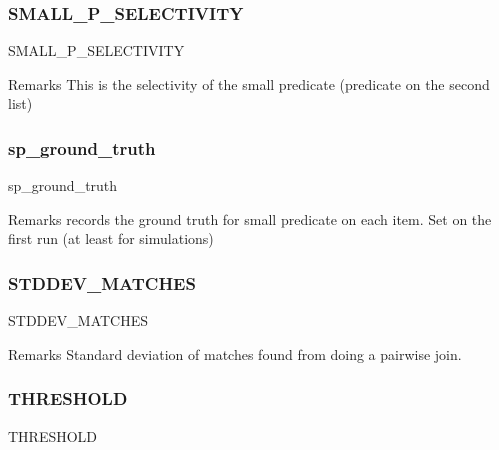 \subsubsection{\texorpdfstring{SMALL\_P\_SELECTIVITY}{SMALL\_P\_SELECTIVITY}}
{\footnotesize\ttfamily S\+M\+A\+L\+L\+\_\+\+P\+\_\+\+S\+E\+L\+E\+C\+T\+I\+V\+I\+TY}

\begin{DoxyRemark}{Remarks}
This is the selectivity of the small predicate (predicate on the second list) 
\end{DoxyRemark}
\mbox{\label{classdynamicfilterapp_1_1models_1_1_join_a26373c16feba2f10410b78ea16841a21}} 
\subsubsection{\texorpdfstring{sp\_ground\_truth}{sp\_ground\_truth}}
{\footnotesize\ttfamily sp\+\_\+ground\+\_\+truth}

\begin{DoxyRemark}{Remarks}
records the ground truth for small predicate on each item. Set on the first run (at least for simulations) 
\end{DoxyRemark}
\mbox{\label{classdynamicfilterapp_1_1models_1_1_join_a52e0d809d7c34941ca658179c684cc1d}} 
\subsubsection{\texorpdfstring{STDDEV\_MATCHES}{STDDEV\_MATCHES}}
{\footnotesize\ttfamily S\+T\+D\+D\+E\+V\+\_\+\+M\+A\+T\+C\+H\+ES}

\begin{DoxyRemark}{Remarks}
Standard deviation of matches found from doing a pairwise join. 
\end{DoxyRemark}
\mbox{\label{classdynamicfilterapp_1_1models_1_1_join_a961b71469dafbf4908b0a7cd19e7f04c}} 
\subsubsection{\texorpdfstring{THRESHOLD}{THRESHOLD}}
{\footnotesize\ttfamily T\+H\+R\+E\+S\+H\+O\+LD}

